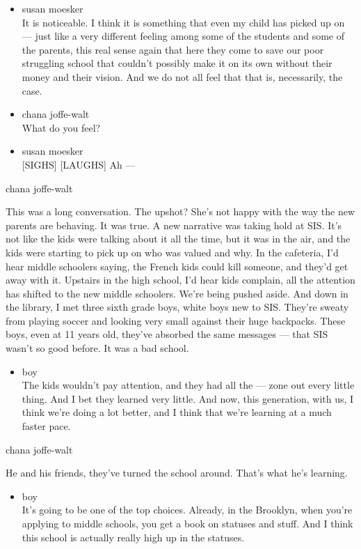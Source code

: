 \begin{itemize}
\item
  susan moesker\\
  It is noticeable. I think it is something that even my child has
  picked up on --- just like a very different feeling among some of the
  students and some of the parents, this real sense again that here they
  come to save our poor struggling school that couldn't possibly make it
  on its own without their money and their vision. And we do not all
  feel that that is, necessarily, the case.
\item
  chana joffe-walt\\
  What do you feel?
\item
  susan moesker\\
  {[}SIGHS{]} {[}LAUGHS{]} Ah ---
\end{itemize}

chana joffe-walt

This was a long conversation. The upshot? She's not happy with the way
the new parents are behaving. It was true. A new narrative was taking
hold at SIS. It's not like the kids were talking about it all the time,
but it was in the air, and the kids were starting to pick up on who was
valued and why. In the cafeteria, I'd hear middle schoolers saying, the
French kids could kill someone, and they'd get away with it. Upstairs in
the high school, I'd hear kids complain, all the attention has shifted
to the new middle schoolers. We're being pushed aside. And down in the
library, I met three sixth grade boys, white boys new to SIS. They're
sweaty from playing soccer and looking very small against their huge
backpacks. These boys, even at 11 years old, they've absorbed the same
messages --- that SIS wasn't so good before. It was a bad school.

\begin{itemize}
\tightlist
\item
  boy\\
  The kids wouldn't pay attention, and they had all the --- zone out
  every little thing. And I bet they learned very little. And now, this
  generation, with us, I think we're doing a lot better, and I think
  that we're learning at a much faster pace.
\end{itemize}

chana joffe-walt

He and his friends, they've turned the school around. That's what he's
learning.

\begin{itemize}
\tightlist
\item
  boy\\
  It's going to be one of the top choices. Already, in the Brooklyn,
  when you're applying to middle schools, you get a book on statuses and
  stuff. And I think this school is actually really high up in the
  statuses.
\end{itemize}

